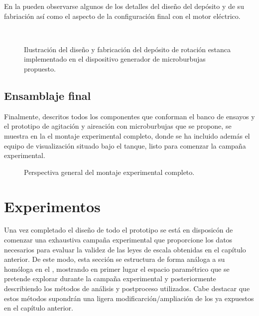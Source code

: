 En la  pueden observarse algunos de los detalles del diseño del depósito y de su fabriación así como el aspecto de la configuración final con el motor eléctrico.
\begin{figure}
\centering
{}
 \\
\caption{Ilustración del diseño y fabricación del depósito de rotación estanca implementado en el dispositivo generador de microburbujas propuesto.}
\end{figure}

\subsection{Ensamblaje final}


Finalmente, descritos todos los componentes que conforman el banco de ensayos y el prototipo de agitación y aireación con microburbujas que se propone, se muestra en la  el montaje experimental completo, donde se ha incluido además el equipo de visualización situado bajo el tanque, listo para comenzar la campaña experimental. 

\begin{figure}
\centering
{}
\caption{Perspectiva general del montaje experimental completo.}
\end{figure}



\section{Experimentos}

Una vez completado el diseño de todo el prototipo se está en disposicón de comenzar una exhaustiva campaña experimental que proporcione los datos  necesarios para evaluar la validez  de las leyes de escala obtenidas en el capítulo anterior. De este modo, esta sección se estructura de forma análoga a su homóloga en el , mostrando en primer lugar el espacio paramétrico que se pretende explorar durante la campaña experimental y posteriormente describiendo los métodos de análisis y postproceso utilizados. Cabe destacar que estos métodos supondrán una ligera modificarción/ampliación de los ya expuestos en el capítulo anterior.


